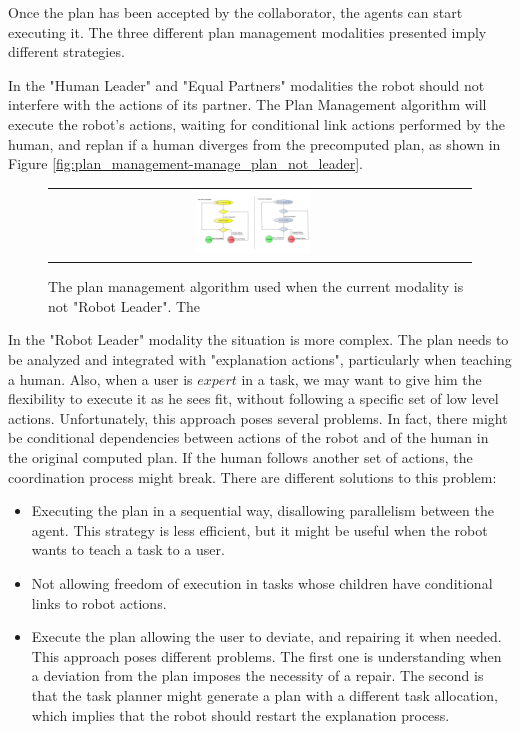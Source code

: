 Once the plan has been accepted by the collaborator, the agents can start executing it. The three different plan management modalities presented imply different strategies.

In the "Human Leader" and "Equal Partners" modalities the robot should not interfere with the actions of its partner. The Plan Management algorithm will execute the robot's actions, waiting for conditional link actions performed by the human, and replan if a human diverges from the precomputed plan, as shown in Figure \ref{fig:plan_management-manage_plan_not_leader}. 

\begin{figure}[ht!]
 \centering
 \begin{tabular}{cc}
  \includegraphics[width=0.29\textwidth]{img/plan_management/manage_plan_not_leader.pdf}
 \end{tabular}
   \vspace{-6pt}
 \caption{The plan management algorithm used when the current modality is not "Robot Leader". The}
 \label{fig:plan_management-manage_plan_not_leader. The algorithm is composed by different threads, one for each agent. In this instance, the left lane represents the robot's management thread, while the right a human's management thread. Elliptic nodes represent operations, while diamond nodes divergences in the algorithm.}
 \end{figure}



In the "Robot Leader" modality the situation is more complex. The plan needs to be analyzed and integrated with "explanation actions", particularly when teaching a human. Also, when a user is $expert$ in a task, we may want to give him the flexibility to execute it as he sees fit, without following a specific set of low level actions.  Unfortunately, this approach poses several problems. In fact, there might be conditional dependencies between actions of the robot and of the human in the original computed plan. If the human follows another set of actions, the coordination process might break. There are different solutions to this problem:
\begin{itemize}
	\item Executing the plan in a sequential way, disallowing parallelism between the agent. This strategy is less efficient, but it might be useful when the robot wants to teach a task to a user.
	\item Not allowing freedom of execution in tasks whose children have conditional links to robot actions. 
	\item Execute the plan allowing the user to deviate, and repairing it when needed. This approach poses different problems. The first one is understanding when a deviation from the plan imposes the necessity of a repair. The second is that the task planner might generate a plan with a different task allocation, which implies that the robot should restart the explanation process.
\end{itemize}

